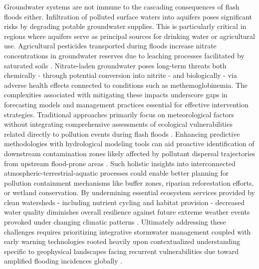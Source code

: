 Groundwater systems are not immune to the cascading consequences of flash floods either. Infiltration of polluted surface waters into aquifers poses significant risks by degrading potable groundwater supplies. This is particularly critical in regions where aquifers serve as principal sources for drinking water or agricultural use. Agricultural pesticides transported during floods increase nitrate concentrations in groundwater reserves due to leaching processes facilitated by saturated soils \citep{Abegaz2024}. Nitrate-laden groundwater poses long-term threats both chemically - through potential conversion into nitrite - and biologically - via adverse health effects connected to conditions such as methemoglobinemia.
The complexities associated with mitigating these impacts underscore gaps in forecasting models and management practices essential for effective intervention strategies. Traditional approaches primarily focus on meteorological factors without integrating comprehensive assessments of ecological vulnerabilities related directly to pollution events during flash floods \citep{AlRawas2024}\citep{Georgakakos2022}. Enhancing predictive methodologies with hydrological modeling tools can aid proactive identification of downstream contamination zones likely affected by pollutant dispersal trajectories from upstream flood-prone areas \citep{Kuksina2020}\citep{Georgakakos2022}. Such holistic insights into interconnected atmospheric-terrestrial-aquatic processes could enable better planning for pollution containment mechanisms like buffer zones, riparian reforestation efforts, or wetland conservation.
By undermining essential ecosystem services provided by clean watersheds - including nutrient cycling and habitat provision - decreased water quality diminishes overall resilience against future extreme weather events provoked under changing climatic patterns \citep{Msigwa2024}. Ultimately addressing these challenges requires prioritizing integrative stormwater management coupled with early warning technologies rooted heavily upon contextualized understanding specific to geophysical landscapes facing recurrent vulnerabilities due toward amplified flooding incidences globally \citep{Abegaz2024}\citep{Msigwa2024}\citep{Georgakakos2022}.
